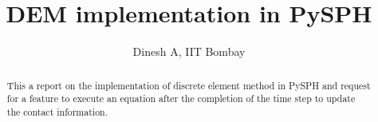 \documentclass{article}
\begin{document}
\title{\sffamily \textbf{DEM implementation in PySPH}}

\author{Dinesh A, IIT Bombay}

\maketitle


\begin{abstract}
  This a report on the implementation of discrete element method in PySPH and
  request for a feature to execute an equation after the completion of the time
  step to update the contact information.
\end{abstract}




% 
% 
\end{document}
